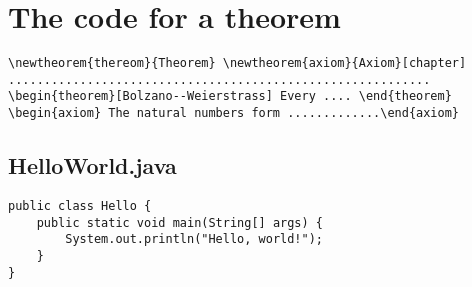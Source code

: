 \documentclass{article}
\begin{document}
\section{The code for a theorem}
\begin{verbatim}
\newtheorem{thereom}{Theorem} \newtheorem{axiom}{Axiom}[chapter]
...........................................................
\begin{theorem}[Bolzano--Weierstrass] Every .... \end{theorem}
\begin{axiom} The natural numbers form .............\end{axiom}
\end{verbatim}
\subsection{HelloWorld.java}
\begin{comment}

This is a trivial java hello world program that I created on the spot.
It has not been tested that it actually compiles.

\end{comment}
\begin{verbatim}
public class Hello {
    public static void main(String[] args) {
        System.out.println("Hello, world!");
    }
}
\end{verbatim}
\end{document}
